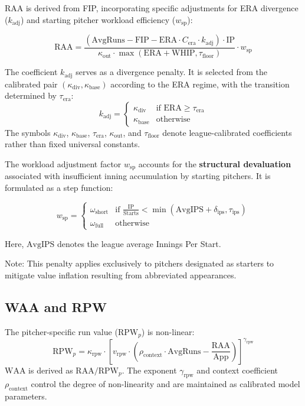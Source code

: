 \documentclass[uplatex,a4paper,11pt,dvipdfmx]{jsarticle}
\newcommand{\mvar}[1]{\mathrm{#1}}
\begin{document}
RAA is derived from FIP, incorporating specific adjustments for ERA divergence ($k_{\text{adj}}$) and starting pitcher workload efficiency ($w_{\text{sp}}$):

\begin{equation}
\mvar{RAA} = \frac{(\mvar{AvgRuns} - \mvar{FIP} - \mvar{ERA} \cdot C_{\text{era}} \cdot k_{\text{adj}}) \cdot \mvar{IP}}{\kappa_{\text{out}} \cdot \max(\mvar{ERA} + \mvar{WHIP}, \tau_{\text{floor}})} \cdot w_{\text{sp}}
\end{equation}

The coefficient $k_{\text{adj}}$ serves as a divergence penalty. It is selected from the calibrated pair $(\kappa_{\text{div}}, \kappa_{\text{base}})$ according to the ERA regime, with the transition determined by $\tau_{\text{era}}$:
\begin{equation}
k_{\text{adj}} = \begin{cases}
\kappa_{\text{div}} & \text{if } \mvar{ERA} \ge \tau_{\text{era}} \\
\kappa_{\text{base}} & \text{otherwise}
\end{cases}
\end{equation}
The symbols $\kappa_{\text{div}}$, $\kappa_{\text{base}}$, $\tau_{\text{era}}$, $\kappa_{\text{out}}$, and $\tau_{\text{floor}}$ denote league-calibrated coefficients rather than fixed universal constants.

The workload adjustment factor $w_{\text{sp}}$ accounts for the \textbf{structural devaluation} associated with insufficient inning accumulation by starting pitchers. It is formulated as a step function:

\begin{equation}
w_{\text{sp}} = \begin{cases} 
\omega_{\text{short}} & \text{if } \frac{\mvar{IP}}{\mvar{Starts}} < \min(\mvar{AvgIPS} + \delta_{\text{ips}}, \tau_{\text{ips}}) \\
\omega_{\text{full}} & \text{otherwise}
\end{cases}
\end{equation}

Here, $\mvar{AvgIPS}$ denotes the league average Innings Per Start.

\noindent Note: This penalty applies exclusively to pitchers designated as starters to mitigate value inflation resulting from abbreviated appearances.

\subsection{WAA and RPW}
The pitcher-specific run value ($\mvar{RPW}_{p}$) is non-linear:
\begin{equation}
\mvar{RPW}_{p} = \kappa_{\text{rpw}} \cdot \left[ v_{\text{rpw}} \cdot \left( \rho_{\text{context}} \cdot \mvar{AvgRuns} - \frac{\mvar{RAA}}{\mvar{App}} \right) \right]^{\gamma_{\text{rpw}}}
\end{equation}
$\mvar{WAA}$ is derived as $\mvar{RAA} / \mvar{RPW}_{p}$. The exponent $\gamma_{\text{rpw}}$ and context coefficient $\rho_{\text{context}}$ control the degree of non-linearity and are maintained as calibrated model parameters.
\end{document}
